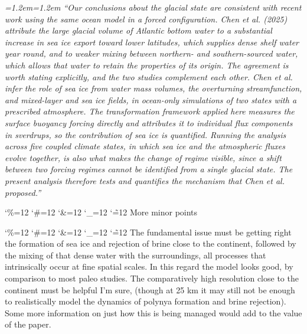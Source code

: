 \documentclass[11pt,a4paper]{article}
\newcommand{\comment}[1]{\par\medskip\noindent\color{black}\begingroup\catcode`\%=12 \catcode`\#=12 \catcode`\&=12 \catcode`\_=12 \catcode`\~=12 \commentbody}
\newcommand{\commentbody}[1]{#1\endgroup\par\smallskip}
\newenvironment{change}{\par\smallskip\color{chgcol}\small\itshape\leftskip=1.2em\rightskip=1.2em\noindent\ignorespaces}{\par\smallskip}
\begin{document}
\begin{change}
``Our conclusions about the glacial state are consistent with recent work using the same ocean model in a forced configuration. Chen et al. (2025) attribute the large glacial volume of Atlantic bottom water to a substantial increase in sea ice export toward lower latitudes, which supplies dense shelf water year round, and to weaker mixing between northern- and southern-sourced water, which allows that water to retain the properties of its origin. The agreement is worth stating explicitly, and the two studies complement each other. Chen et al. infer the role of sea ice from water mass volumes, the overturning streamfunction, and mixed-layer and sea ice fields, in ocean-only simulations of two states with a prescribed atmosphere. The transformation framework applied here measures the surface buoyancy forcing directly and attributes it to individual flux components in sverdrups, so the contribution of sea ice is quantified. Running the analysis across five coupled climate states, in which sea ice and the atmospheric fluxes evolve together, is also what makes the change of regime visible, since a shift between two forcing regimes cannot be identified from a single glacial state. The present analysis therefore tests and quantifies the mechanism that Chen et al. proposed.''
\end{change}

\comment{R2}{More minor points}

\comment{R2}{The fundamental issue must be getting right the formation of sea ice and rejection of brine close to the continent, followed by the mixing of that dense water with the surroundings, all processes that intrinsically occur at fine spatial scales. In this regard the model looks good, by comparison to most paleo studies. The comparatively high resolution close to the continent must be helpful I'm sure, (though at 25 km it may still not be enough to realistically model the dynamics of polynya formation and brine rejection). Some more information on just how this is being managed would add to the value of the paper.}
\end{document}
